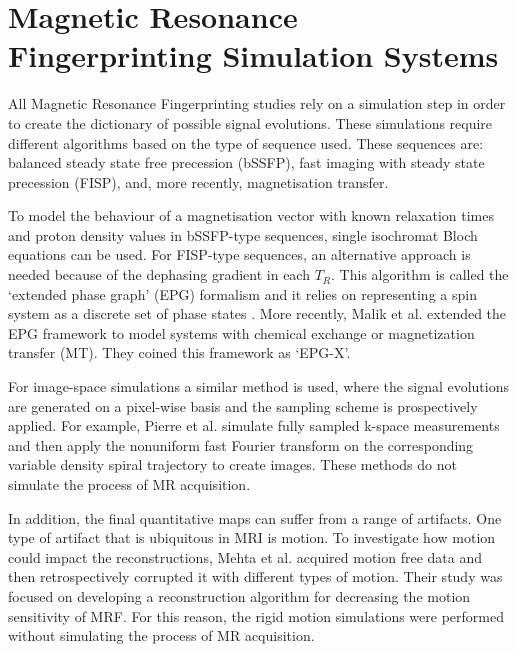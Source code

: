 \section{Magnetic Resonance Fingerprinting Simulation Systems}
\label{chapterlabel2sec2}

All Magnetic Resonance Fingerprinting studies rely on a simulation step in order to create the dictionary of possible signal evolutions.
These simulations require different algorithms based on the type of sequence used.
These sequences are: balanced steady state free precession (bSSFP), fast imaging with steady state precession (FISP), and, more recently, magnetisation transfer.

\hfill

To model the behaviour of a magnetisation vector with known relaxation times and proton density values in bSSFP-type sequences, single isochromat Bloch equations can be used. 
For FISP-type sequences, an alternative approach is needed because of the dephasing gradient in each $T_R$.
This algorithm is called the `extended phase graph' (EPG) formalism and it relies on representing a spin system as a discrete set of phase states \cite{Weigel2015}.
More recently, Malik et al. \cite{Malik2017} extended the EPG framework to model systems with chemical exchange or magnetization transfer (MT). They coined this framework as `EPG-X'.

\hfill

For image-space simulations a similar method is used, where the signal evolutions are generated on a pixel-wise basis and the sampling scheme is prospectively applied.
For example, Pierre et al. \cite{Pierre2016} simulate fully sampled k-space measurements and then apply the nonuniform fast Fourier transform on the corresponding variable density spiral trajectory to create images. 
These methods do not simulate the process of MR acquisition.

\hfill

In addition, the final quantitative maps can suffer from a range of artifacts.
One type of artifact that is ubiquitous in MRI is motion.
To investigate how motion could impact the reconstructions, Mehta et al. \cite{Mehta2017} acquired motion free data and then retrospectively corrupted it with different types of motion.
Their study was focused on developing a reconstruction algorithm for decreasing the motion sensitivity of MRF.
For this reason, the rigid motion simulations were performed without simulating the process of MR acquisition.

